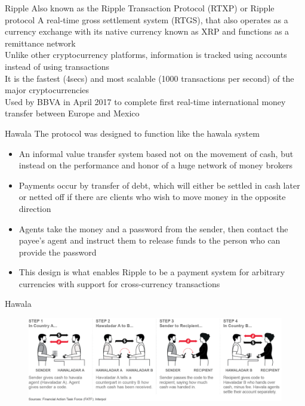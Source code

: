 \documentclass[9pt]{beamer}
\begin{document}

\begin{frame}{Ripple}
	Also known as the Ripple Transaction Protocol (RTXP) or Ripple protocol
	A real-time gross settlement system (RTGS), that also operates as a currency exchange with its native currency known as XRP and functions as a remittance network\\ \vspace{3mm}
	Unlike other cryptocurrency platforms, information is tracked using accounts instead of using transactions\\ \vspace{3mm}
	It is the fastest (4secs) and most scalable (1000 transactions per second) of the major cryptocurrencies\\ \vspace{3mm}
	Used by BBVA in April 2017 to complete first real-time international money transfer between Europe and Mexico
\end{frame}


\begin{frame}{Hawala}
	The protocol was designed to function like the hawala system
	\begin{itemize}
		\item An informal value transfer system based not on the movement of cash, but instead on the performance and honor of a huge network of money brokers
		\item Payments occur by transfer of debt, which will either be settled in cash later or netted off if there are clients who wish to move money in the opposite direction
		\item Agents take the money and a password from the sender, then contact the payee's agent and instruct them to release funds to the person who can provide the password
		\item This design is what enables Ripple to be a payment system for arbitrary currencies with support for cross-currency transactions
	\end{itemize}
\end{frame}


\begin{frame}{Hawala}
	\begin{figure}[]
		\centering
		\includegraphics  [scale=0.3]{Images/hawala}
	\end{figure}
\end{frame}
\end{document}
